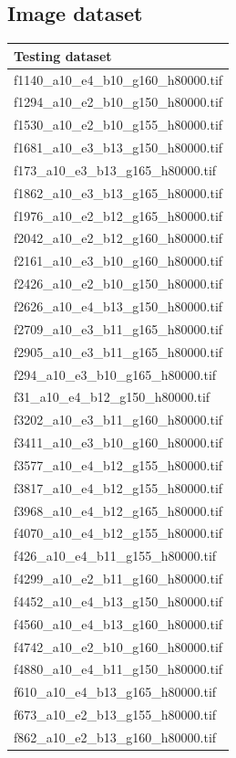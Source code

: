 \documentclass[12pt, twoside]{article}
\begin{document}
\begin{appendices}
	\subsection{Image dataset}
	\begin{longtable}{|l|}
		\hline
		Testing dataset \\ \hline 
		f1140\_a10\_e4\_b10\_g160\_h80000.tif \\ \hline 
		f1294\_a10\_e2\_b10\_g150\_h80000.tif \\ \hline 
		f1530\_a10\_e2\_b10\_g155\_h80000.tif \\ \hline 
		f1681\_a10\_e3\_b13\_g150\_h80000.tif \\ \hline 
		f173\_a10\_e3\_b13\_g165\_h80000.tif \\ \hline 
		f1862\_a10\_e3\_b13\_g165\_h80000.tif \\ \hline 
		f1976\_a10\_e2\_b12\_g165\_h80000.tif \\ \hline 
		f2042\_a10\_e2\_b12\_g160\_h80000.tif \\ \hline 
		f2161\_a10\_e3\_b10\_g160\_h80000.tif \\ \hline 
		f2426\_a10\_e2\_b10\_g150\_h80000.tif \\ \hline 
		f2626\_a10\_e4\_b13\_g150\_h80000.tif \\ \hline 
		f2709\_a10\_e3\_b11\_g165\_h80000.tif \\ \hline 
		f2905\_a10\_e3\_b11\_g165\_h80000.tif \\ \hline 
		f294\_a10\_e3\_b10\_g165\_h80000.tif \\ \hline 
		f31\_a10\_e4\_b12\_g150\_h80000.tif \\ \hline 
		f3202\_a10\_e3\_b11\_g160\_h80000.tif \\ \hline 
		f3411\_a10\_e3\_b10\_g160\_h80000.tif \\ \hline 
		f3577\_a10\_e4\_b12\_g155\_h80000.tif \\ \hline 
		f3817\_a10\_e4\_b12\_g155\_h80000.tif \\ \hline 
		f3968\_a10\_e4\_b12\_g165\_h80000.tif \\ \hline 
		f4070\_a10\_e4\_b12\_g155\_h80000.tif \\ \hline 
		f426\_a10\_e4\_b11\_g155\_h80000.tif \\ \hline 
		f4299\_a10\_e2\_b11\_g160\_h80000.tif \\ \hline 
		f4452\_a10\_e4\_b13\_g150\_h80000.tif \\ \hline 
		f4560\_a10\_e4\_b13\_g160\_h80000.tif \\ \hline 
		f4742\_a10\_e2\_b10\_g160\_h80000.tif \\ \hline 
		f4880\_a10\_e4\_b11\_g150\_h80000.tif \\ \hline 
		f610\_a10\_e4\_b13\_g165\_h80000.tif \\ \hline 
		f673\_a10\_e2\_b13\_g155\_h80000.tif \\ \hline 
		f862\_a10\_e2\_b13\_g160\_h80000.tif \\ \hline 
	\end{longtable}
	

\end{appendices}
\end{document}
